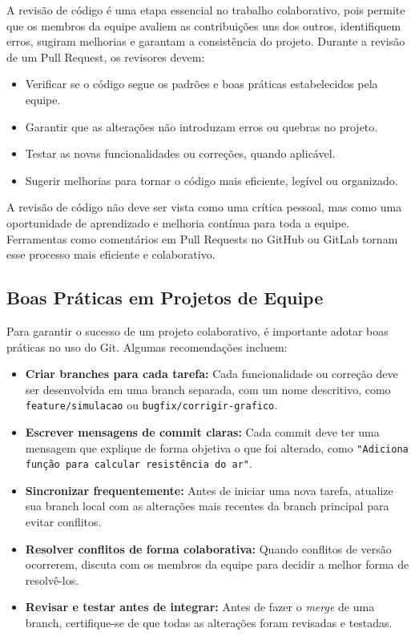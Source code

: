 A revisão de código é uma etapa essencial no trabalho colaborativo, pois permite que os membros da equipe avaliem as contribuições uns dos outros, identifiquem erros, sugiram melhorias e garantam a consistência do projeto. Durante a revisão de um Pull Request, os revisores devem:
\begin{itemize}
    \item Verificar se o código segue os padrões e boas práticas estabelecidos pela equipe.
    \item Garantir que as alterações não introduzam erros ou quebras no projeto.
    \item Testar as novas funcionalidades ou correções, quando aplicável.
    \item Sugerir melhorias para tornar o código mais eficiente, legível ou organizado.
\end{itemize}

A revisão de código não deve ser vista como uma crítica pessoal, mas como uma oportunidade de aprendizado e melhoria contínua para toda a equipe. Ferramentas como comentários em Pull Requests no GitHub ou GitLab tornam esse processo mais eficiente e colaborativo.

\subsection{Boas Práticas em Projetos de Equipe}

Para garantir o sucesso de um projeto colaborativo, é importante adotar boas práticas no uso do Git. Algumas recomendações incluem:
\begin{itemize}
    \item \textbf{Criar branches para cada tarefa:} Cada funcionalidade ou correção deve ser desenvolvida em uma branch separada, com um nome descritivo, como \texttt{feature/simulacao} ou \texttt{bugfix/corrigir-grafico}.
    \item \textbf{Escrever mensagens de commit claras:} Cada commit deve ter uma mensagem que explique de forma objetiva o que foi alterado, como \texttt{"Adiciona função para calcular resistência do ar"}.
    \item \textbf{Sincronizar frequentemente:} Antes de iniciar uma nova tarefa, atualize sua branch local com as alterações mais recentes da branch principal para evitar conflitos.
    \item \textbf{Resolver conflitos de forma colaborativa:} Quando conflitos de versão ocorrerem, discuta com os membros da equipe para decidir a melhor forma de resolvê-los.
    \item \textbf{Revisar e testar antes de integrar:} Antes de fazer o \textit{merge} de uma branch, certifique-se de que todas as alterações foram revisadas e testadas.
\end{itemize}

